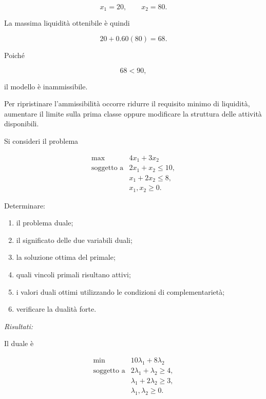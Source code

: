 \[
x_1=20,
\qquad
x_2=80.
\]

La massima liquidit\`a ottenibile \`e quindi

\[
20+0.60(80)
=
68.
\]

Poich\'e

\[
68<90,
\]

\noindent il modello \`e inammissibile.

Per ripristinare l'ammissibilit\`a occorre ridurre il requisito minimo di
liquidit\`a, aumentare il limite sulla prima classe oppure modificare la
struttura delle attivit\`a disponibili.


\begin{exercise}

\label{ex:cap11-proposto-duale}

Si consideri il problema

\[
\begin{array}{ll}
\max
&
4x_1+3x_2
\\[3pt]
\mbox{soggetto a}
&
2x_1+x_2\leq10,
\\
&
x_1+2x_2\leq8,
\\
&
x_1,x_2\geq0.
\end{array}
\]

Determinare:

\begin{enumerate}

\item il problema duale;

\item il significato delle due variabili duali;

\item la soluzione ottima del primale;

\item quali vincoli primali risultano attivi;

\item i valori duali ottimi utilizzando le condizioni di
complementariet\`a;

\item verificare la dualit\`a forte.

\end{enumerate}

\end{exercise}

\noindent
\textit{Risultati:}

Il duale \`e

\[
\begin{array}{ll}
\min
&
10\lambda_1+8\lambda_2
\\[3pt]
\mbox{soggetto a}
&
2\lambda_1+\lambda_2\geq4,
\\
&
\lambda_1+2\lambda_2\geq3,
\\
&
\lambda_1,\lambda_2\geq0.
\end{array}
\]

